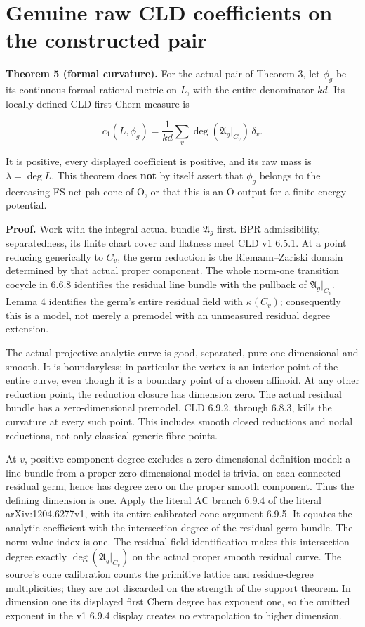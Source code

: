 \documentclass[
  11pt,
]{article}
\begin{document}
\section{Genuine raw CLD coefficients on the constructed
pair}\label{genuine-raw-cld-coefficients-on-the-constructed-pair}

\textbf{Theorem 5 (formal curvature).} For the actual pair of Theorem 3,
let \(\phi_g\) be its continuous formal rational metric on \(L\), with
the entire denominator \(kd\). Its locally defined CLD first Chern
measure is

\[
 c_1(L,\phi_g)=\frac1{kd}\sum_v
        \deg(\mathfrak A_g|_{C_v})\,\delta_v.
\]

It is positive, every displayed coefficient is positive, and its raw
mass is \(\lambda=\deg L\). This theorem does \textbf{not} by itself
assert that \(\phi_g\) belongs to the decreasing-FS-net psh cone of O,
or that this is an O output for a finite-energy potential.

\textbf{Proof.} Work with the integral actual bundle \(\mathfrak A_g\)
first. BPR admissibility, separatedness, its finite chart cover and
flatness meet CLD v1 6.5.1. At a point reducing generically to \(C_v\),
the germ reduction is the Riemann--Zariski domain determined by that
actual proper component. The whole norm-one transition cocycle in 6.6.8
identifies the residual line bundle with the pullback of
\(\mathfrak A_g|_{C_v}\). Lemma 4 identifies the germ's entire residual
field with \(\kappa(C_v)\); consequently this is a model, not merely a
premodel with an unmeasured residual degree extension.

The actual projective analytic curve is good, separated, pure
one-dimensional and smooth. It is boundaryless; in particular the vertex
is an interior point of the entire curve, even though it is a boundary
point of a chosen affinoid. At any other reduction point, the reduction
closure has dimension zero. The actual residual bundle has a
zero-dimensional premodel. CLD 6.9.2, through 6.8.3, kills the curvature
at every such point. This includes smooth closed reductions and nodal
reductions, not only classical generic-fibre points.

At \(v\), positive component degree excludes a zero-dimensional
definition model: a line bundle from a proper zero-dimensional model is
trivial on each connected residual germ, hence has degree zero on the
proper smooth component. Thus the defining dimension is one. Apply the
literal AC branch 6.9.4 of the literal arXiv:1204.6277v1, with its
entire calibrated-cone argument 6.9.5. It equates the analytic
coefficient with the intersection degree of the residual germ bundle.
The norm-value index is one. The residual field identification makes
this intersection degree exactly \(\deg(\mathfrak A_g|_{C_v})\) on the
actual proper smooth residual curve. The source's cone calibration
counts the primitive lattice and residue-degree multiplicities; they are
not discarded on the strength of the support theorem. In dimension one
its displayed first Chern degree has exponent one, so the omitted
exponent in the v1 6.9.4 display creates no extrapolation to higher
dimension.
\end{document}
